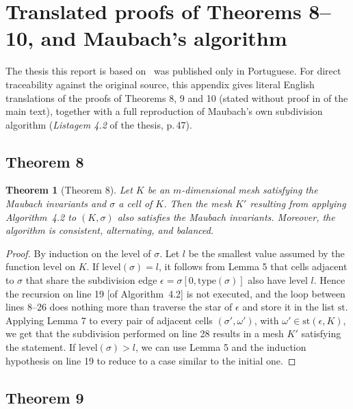 \documentclass[11pt]{article}
\newtheorem*{thmthm}{Theorem}
\newcommand{\type}{\mathrm{type}}
\newcommand{\level}{\mathrm{level}}
\newcommand{\st}{\mathrm{st}}
\begin{document}
\section{Translated proofs of Theorems 8--10, and Maubach's algorithm}
\label{app:proofs}

The thesis this report is based on~\cite{mello2006} was published only in
Portuguese. For
direct traceability against the original source, this appendix gives
literal English translations of the proofs of Theorems 8, 9 and 10
(stated without proof in  of the main
text), together with a full reproduction of Maubach's own subdivision
algorithm (\emph{Listagem 4.2} of the thesis, p.\,47).

\subsection*{Theorem 8}

\begin{thmthm}[Theorem 8]
Let $K$ be an $m$-dimensional mesh satisfying the Maubach invariants and
$\sigma$ a cell of $K$. Then the mesh $K'$ resulting from applying
Algorithm~4.2 to $(K,\sigma)$ also satisfies the Maubach invariants.
Moreover, the algorithm is consistent, alternating, and balanced.
\end{thmthm}

\begin{proof}
By induction on the level of $\sigma$. Let $l$ be the smallest value
assumed by the function $\level$ on $K$. If $\level(\sigma)=l$, it follows
from Lemma 5 that cells adjacent to $\sigma$ that share the subdivision
edge $\epsilon=\sigma[0,\type(\sigma)]$ also have level $l$. Hence the
recursion on line 19 [of Algorithm~4.2] is not executed, and the loop
between lines 8--26 does nothing more than traverse the star of $\epsilon$
and store it in the list $\mathrm{st}$. Applying Lemma 7 to every pair of
adjacent cells $(\sigma',\omega')$, with $\omega'\in\st(\epsilon,K)$, we
get that the subdivision performed on line 28 results in a mesh $K'$
satisfying the statement. If $\level(\sigma)>l$, we can use Lemma 5 and
the induction hypothesis on line 19 to reduce to a case similar to the
initial one.
\end{proof}

\subsection*{Theorem 9}
\end{document}
